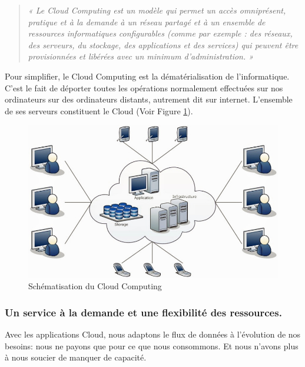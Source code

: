 \documentclass{report}
\begin{document}
    \begin{quotation}
      \emph{« Le Cloud Computing est un modèle qui permet un accès omniprésent, pratique et à la demande à un réseau partagé et à un ensemble de ressources informatiques configurables (comme par exemple : des réseaux, des serveurs, du stockage, des applications et des services) qui peuvent être provisionnées et libérées avec un minimum d’administration. »}\\
    \end{quotation}

    Pour simplifier, le Cloud Computing est la dématérialisation de l’informatique. C’est le fait de déporter toutes les opérations normalement effectuées sur nos ordinateurs sur des ordinateurs distants, autrement dit sur internet. L’ensemble de ses serveurs constituent le Cloud (Voir Figure \ref{Cloud Computing}).

    \begin{figure}
      \begin{center}
        \includegraphics[scale=0.3]{images/CloudComputing.jpg}
      \end{center}
      \caption{Schématisation du Cloud Computing}
      \label{Cloud Computing}
    \end{figure}

    \subsubsection{Un service à la demande et une flexibilité des ressources.}
    Avec les applications Cloud, nous adaptons le flux de données à l'évolution de nos besoins: nous ne payons que pour ce que nous consommons. Et nous n'avons plus à nous soucier de manquer de capacité.
\end{document}
